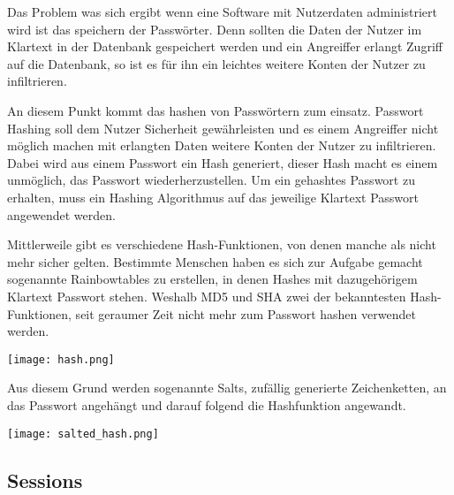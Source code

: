 \documentclass[11pt]{article}
\begin{document}
		\begin{flushleft}
			Das Problem was sich ergibt wenn eine Software mit Nutzerdaten administriert wird ist das speichern der Passwörter. Denn sollten die Daten der Nutzer im Klartext in der Datenbank gespeichert werden und ein Angreiffer erlangt Zugriff auf die Datenbank, so ist es für ihn ein leichtes weitere Konten der Nutzer zu infiltrieren.\par\bigskip
		
			An diesem Punkt kommt das hashen von Passwörtern zum einsatz. Passwort Hashing soll dem Nutzer Sicherheit gewährleisten und es einem Angreiffer nicht möglich machen mit erlangten Daten weitere Konten der Nutzer zu infiltrieren. Dabei wird aus einem Passwort ein Hash generiert, dieser Hash macht es einem unmöglich, das Passwort wiederherzustellen. Um ein gehashtes Passwort zu erhalten, muss ein Hashing Algorithmus auf das jeweilige Klartext Passwort angewendet werden.\par\bigskip
			
			Mittlerweile gibt es verschiedene Hash-Funktionen, von denen manche als nicht mehr sicher gelten. Bestimmte Menschen haben es sich zur Aufgabe gemacht sogenannte Rainbowtables zu erstellen, in denen Hashes mit dazugehörigem Klartext Passwort stehen. Weshalb MD5 und SHA zwei der bekanntesten Hash-Funktionen, seit geraumer Zeit nicht mehr zum Passwort hashen verwendet werden.
			
			\texttt{[image: hash.png]}\par\bigskip
			
			Aus diesem Grund werden sogenannte Salts, zufällig generierte Zeichenketten, an das Passwort angehängt und darauf folgend die Hashfunktion angewandt. 
			
			\begin{center}
				\texttt{[image: salted\_hash.png]}
			\end{center}
		\end{flushleft}
	
		\subsection{Sessions}
		\label{sec: sessions}
		
\end{document}
